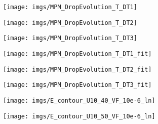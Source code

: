 \documentclass[17pt,a4paper]{article}
\begin{document}
\begin{figure}[!h]
    \centering
    \begin{subfigure}[b]{0.7\textwidth}
        \texttt{[image: imgs/MPM\_DropEvolution\_T\_DT1]}
    \end{subfigure}
    \begin{subfigure}[b]{0.7\textwidth}
        \texttt{[image: imgs/MPM\_DropEvolution\_T\_DT2]}
    \end{subfigure}
    \begin{subfigure}[b]{0.7\textwidth}
        \texttt{[image: imgs/MPM\_DropEvolution\_T\_DT3]}
    \end{subfigure}
\end{figure}
\begin{figure}[!h]
    \centering
    \begin{subfigure}[b]{0.7\textwidth}
        \texttt{[image: imgs/MPM\_DropEvolution\_T\_DT1\_fit]}
    \end{subfigure}
    \begin{subfigure}[b]{0.7\textwidth}
        \texttt{[image: imgs/MPM\_DropEvolution\_T\_DT2\_fit]}
    \end{subfigure}
    \begin{subfigure}[b]{0.7\textwidth}
        \texttt{[image: imgs/MPM\_DropEvolution\_T\_DT3\_fit]}
    \end{subfigure}
\end{figure}



\begin{figure}[!h]
    \centering
    \begin{subfigure}[b]{0.7\textwidth}
        \texttt{[image: imgs/E\_contour\_U10\_40\_VF\_10e-6\_ln]}
    \end{subfigure}
    \begin{subfigure}[b]{0.7\textwidth}
        \texttt{[image: imgs/E\_contour\_U10\_50\_VF\_10e-6\_ln]}
    \end{subfigure}
\end{figure}
\end{document}
